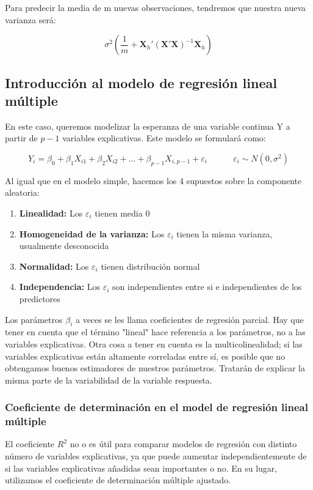 Para predecir la media de m nuevas observaciones, tendremos que nuestra nueva varianza será:

$$
\sigma^2\left(\frac{1}{m}+\mathbf{X}_h'(\mathbf{X'X})^{-1}\mathbf{X}_h\right)
$$

\subsection{Introducción al modelo de regresión lineal múltiple}

En este caso, queremos modelizar la esperanza de una variable continua Y a partir de $p-1$ variables explicativas. Este modelo se formulará como:

$$
Y_i=\beta_0+\beta_1X_{i1}+\beta_2X_{i2}+\dots+\beta_{p-1}X_{i,p-1}+\varepsilon_i\quad\quad\quad\varepsilon_i\sim N(0,\sigma^2)
$$

Al igual que en el modelo simple, hacemos los 4 supuestos sobre la componente aleatoria:

\begin{enumerate}
    \item \textbf{Linealidad:} Los $\varepsilon_i$ tienen media 0
    \item \textbf{Homogeneidad de la varianza: }Los $\varepsilon_i$ tienen la misma varianza, usualmente desconocida
    \item \textbf{Normalidad: }Los $\varepsilon_i$ tienen distribución normal
    \item \textbf{Independencia: }Los $\varepsilon_i$ son independientes entre si e independientes de los predictores
\end{enumerate}

Los parámetros $\beta_i$ a veces se les llama coeficientes de regresión parcial. Hay que tener en cuenta que el término "lineal" hace referencia a los parámetros, no a las variables explicativas. Otra cosa a tener en cuenta es la multicolinealidad; si las variables explicativas están altamente correladas entre sí, es posible que no obtengamos buenos estimadores de nuestros parámetros. Tratarán de explicar la misma parte de la variabilidad de la variable respuesta.

\subsubsection{Coeficiente de determinación en el model de regresión lineal múltiple}

El coeficiente $R^2$ no o es útil para comparar modelos de regresión con distinto número de variables explicativas, ya que puede aumentar independientemente de si las variables explicativas añadidas sean importantes o no. En su lugar, utilizamos el coeficiente de determinación múltiple ajustado.


